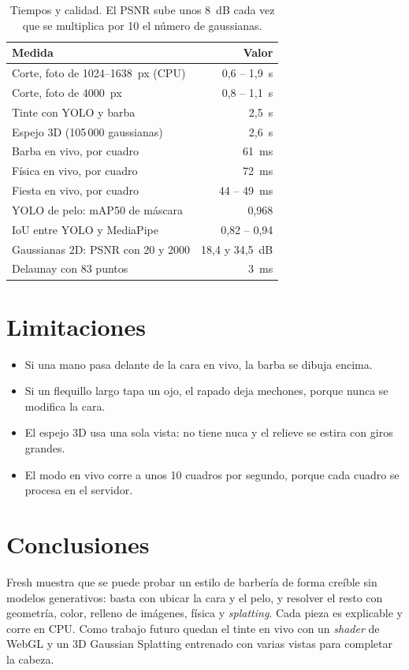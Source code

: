 \documentclass[10pt,a4paper,twocolumn]{article}
\begin{document}
\begin{table}[t]
\centering
\small
\begin{tabular}{@{}lr@{}}
\toprule
Medida & Valor \\
\midrule
Corte, foto de 1024--1638~px (CPU) & 0,6 -- 1,9~s \\
Corte, foto de 4000~px & 0,8 -- 1,1~s \\
Tinte con YOLO y barba & 2,5~s \\
Espejo 3D (105\,000 gaussianas) & 2,6~s \\
Barba en vivo, por cuadro & 61~ms \\
Física en vivo, por cuadro & 72~ms \\
Fiesta en vivo, por cuadro & 44 -- 49~ms \\
\midrule
YOLO de pelo: mAP50 de máscara & 0,968 \\
IoU entre YOLO y MediaPipe & 0,82 -- 0,94 \\
Gaussianas 2D: PSNR con 20 y 2000 & 18,4 y 34,5~dB \\
Delaunay con 83 puntos & 3~ms \\
\bottomrule
\end{tabular}
\caption{Tiempos y calidad. El PSNR sube unos 8~dB cada vez que se multiplica por 10 el número de gaussianas.}
\label{tab:resultados}
\end{table}

\section{Limitaciones}

\begin{itemize}
  \item Si una mano pasa delante de la cara en vivo, la barba se dibuja encima.
  \item Si un flequillo largo tapa un ojo, el rapado deja mechones, porque nunca se modifica la cara.
  \item El espejo 3D usa una sola vista: no tiene nuca y el relieve se estira con giros grandes.
  \item El modo en vivo corre a unos 10 cuadros por segundo, porque cada cuadro se procesa en el servidor.
\end{itemize}

\section{Conclusiones}

Fresh muestra que se puede probar un estilo de barbería de forma creíble sin modelos generativos: basta con ubicar la cara y el pelo, y resolver el resto con geometría, color, relleno de imágenes, física y \emph{splatting}. Cada pieza es explicable y corre en CPU. Como trabajo futuro quedan el tinte en vivo con un \emph{shader} de WebGL y un 3D Gaussian Splatting entrenado con varias vistas para completar la cabeza.
\end{document}

